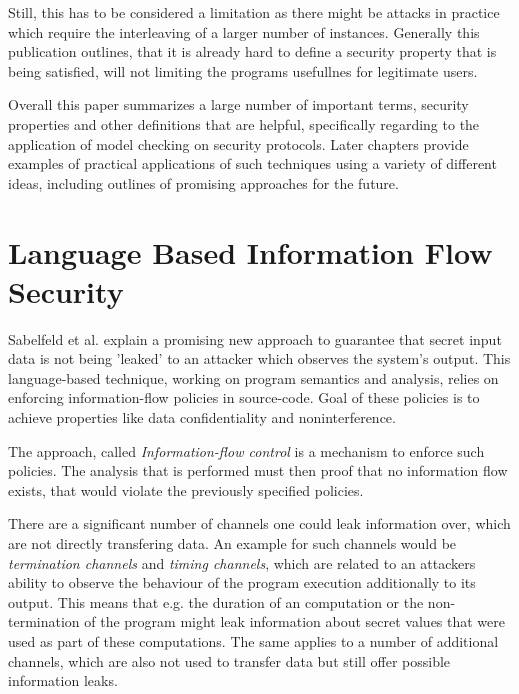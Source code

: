 \documentclass[a4paper,UKenglish]{lipics-v2018}
\begin{document}
Still, this has to be considered a limitation as there might be attacks in practice which require the interleaving of a larger number of instances. Generally this publication outlines, that it is already hard to define a security property that is being satisfied, will not limiting the programs usefullnes for legitimate users.

Overall this paper summarizes a large number of important terms, security properties and other definitions that are helpful, specifically regarding to the application of model checking on security protocols. Later chapters provide examples of practical applications of such techniques using a variety of different ideas, including outlines of promising approaches for the future.






\section{Language Based Information Flow Security}

Sabelfeld et al. explain a promising new approach to guarantee that secret input data is not being 'leaked' to an attacker which observes the system's output. This language-based technique, working on program semantics and analysis, relies on enforcing information-flow policies in source-code. Goal of these policies is to achieve properties like data confidentiality and noninterference.\cite{language_based_information_flow_security}

The approach, called \textit{Information-flow control} is a mechanism to enforce such policies. The analysis that is performed must then proof that no information flow exists, that would violate the previously specified policies.\cite{language_based_information_flow_security}

There are a significant number of channels one could leak information over, which are not directly transfering data. An example for such channels would be \textit{termination channels} and \textit{timing channels}, which are related to an attackers ability to observe the behaviour of the program execution additionally to its output. This means that e.g. the duration of an computation or the non-termination of the program might leak information about secret values that were used as part of these computations.
The same applies to a number of additional channels, which are also not used to transfer data but still offer possible information leaks.\cite{language_based_information_flow_security} %
\end{document}
